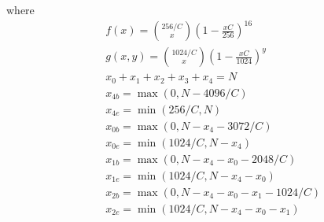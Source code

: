 
where
  \begin{eqnarray*}
    &&f(x) = \binom{256/C}{x}(1-\frac{xC}{256})^{16} \\
    &&g(x,y) = \binom{1024/C}{x}(1-\frac{xC}{1024})^{y} \\
    &&x_0+x_1+x_2+x_3+x_4 = N \\
    &&x_{4b} = \max(0,N-4096/C) \\
    &&x_{4e} = \min(256/C,N) \\
    &&x_{0b} = \max(0,N-x_4-3072/C) \\
    &&x_{0e} = \min(1024/C,N-x_4) \\
    &&x_{1b} = \max(0,N-x_4-x_0-2048/C) \\
    &&x_{1e} = \min(1024/C,N-x_4-x_0) \\
    &&x_{2b} = \max(0,N-x_4-x_0-x_1-1024/C) \\
    &&x_{2e} = \min(1024/C,N-x_4-x_0-x_1)
  \end{eqnarray*}

